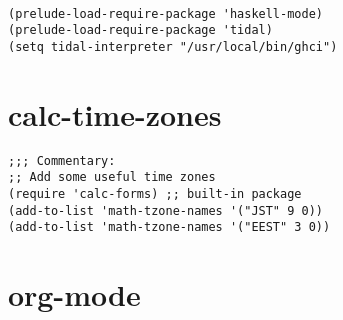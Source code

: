 \documentclass[11pt]{article}
\begin{document}
\begin{verbatim}

(prelude-load-require-package 'haskell-mode)
(prelude-load-require-package 'tidal)
(setq tidal-interpreter "/usr/local/bin/ghci")

\end{verbatim}

\section{calc-time-zones}
\label{sec:orgeafa384}

\begin{verbatim}
;;; Commentary:
;; Add some useful time zones
(require 'calc-forms) ;; built-in package
(add-to-list 'math-tzone-names '("JST" 9 0))
(add-to-list 'math-tzone-names '("EEST" 3 0))
\end{verbatim}
\section{org-mode}
\label{sec:orgad48529}
\end{document}
